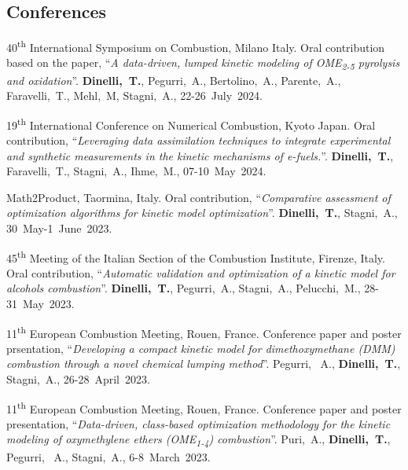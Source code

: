 \subsection{Conferences}
\begin{etaremune}
   \item
      40\textsuperscript{th} International Symposium on Combustion, Milano Italy. Oral
      contribution based on the paper, ``{\it A data-driven, lumped kinetic modeling of
      OME\textsubscript{2-5} pyrolysis and oxidation}''. {\bf Dinelli,~T.},
      Pegurri,~A., Bertolino,~A., Parente,~A., Faravelli,~T., Mehl,~M, Stagni,~A.,
      22-26~July~2024.

   \item
      19\textsuperscript{th} International Conference on Numerical Combustion, Kyoto
      Japan. Oral contribution, ``{\it Leveraging data assimilation techniques to
      integrate experimental and synthetic measurements in the kinetic mechanisms of
      e-fuels.}''. {\bf Dinelli,~T.}, Faravelli,~T., Stagni,~A., Ihme,~M.,
      07-10~May~2024.

   \item
      Math2Product, Taormina, Italy. Oral contribution, ``{\it Comparative
      assessment of optimization algorithms for kinetic model optimization}''.
      {\bf Dinelli,~T.}, Stagni,~A.,
      30~May-1~June~2023.

   \item
      45\textsuperscript{th} Meeting of the Italian Section of the Combustion Institute,
      Firenze, Italy. Oral contribution, ``{\it Automatic validation and optimization
      of a kinetic model for alcohols combustion}''. {\bf Dinelli,~T.},
      Pegurri,~A., Stagni,~A., Pelucchi,~M.,
      28-31~May~2023.

   \item
      11\textsuperscript{th} European Combustion Meeting, Rouen, France. Conference paper
      and poster prsentation, ``{\it Developing a compact kinetic model for
      dimethoxymethane (DMM) combustion through a novel chemical lumping method}''.
      Pegurri, ~A., {\bf Dinelli,~T.}, Stagni,~A.,
      26-28~April~2023.

   \item
      11\textsuperscript{th} European Combustion Meeting, Rouen, France. Conference paper
      and poster presentation, ``{\it Data-driven, class-based optimization methodology
      for the kinetic modeling of oxymethylene ethers (OME\textsubscript{1-4}) combustion}''.
      Puri,~A., {\bf Dinelli,~T.}, Pegurri, ~A., Stagni,~A.,
      6-8~March~2023.


\end{etaremune}
